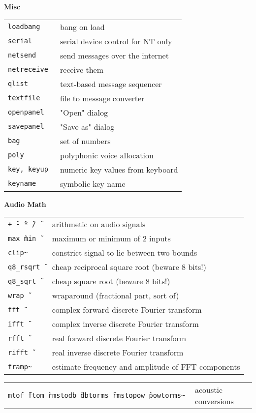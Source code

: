 \documentclass[a4paper, landscape, 10pt]{article}
\newcommand{\refcardtitle}[1]{
  \begin{center}
    \textbf{\small{#1}}
  \end{center}
}
\begin{document}
\begin{multicols}{3}
  \refcardtitle{Misc}
  \begin{tabularx}{9cm}{>{\tt}l X}
    loadbang & bang on load \\
    serial & serial device control for NT only \\
    netsend & send messages over the internet \\
    netreceive & receive them \\
    qlist & text-based message sequencer \\
    textfile & file to message converter \\
    openpanel & "Open" dialog \\
    savepanel & "Save as" dialog \\
    bag & set of numbers \\
    poly & polyphonic voice allocation \\
    key, keyup & numeric key values from keyboard \\
    keyname & symbolic key name \\
  \end{tabularx}

  \refcardtitle{Audio Math}
  \begin{tabularx}{9cm}{>{\tt}l X}
    +\~\ -\~\ *\~\ /\~\ & arithmetic on audio signals \\
    max\~\ min\~\ & maximum or minimum of 2 inputs \\
    clip\~ & constrict signal to lie between two bounds \\
    q8\_rsqrt\~\ & cheap reciprocal square root (beware 8 bits!) \\
    q8\_sqrt\~\ & cheap square root (beware 8 bits!) \\
    wrap\~\ & wraparound (fractional part, sort of) \\
    fft\~\ & complex forward discrete Fourier transform \\
    ifft\~\ & complex inverse discrete Fourier transform \\
    rfft\~\ & real forward discrete Fourier transform \\
    rifft\~\ & real inverse discrete Fourier transform \\
    framp\~ & estimate frequency and amplitude of FFT components \\
  \end{tabularx}
  \begin{tabularx}{9cm}{>{\tt}X l}
    mtof\~\ ftom\~\ rmstodb\~\ dbtorms\~\ rmstopow\~\ powtorms\~ & acoustic conversions \\
  \end{tabularx}


\end{multicols}
\end{document}
